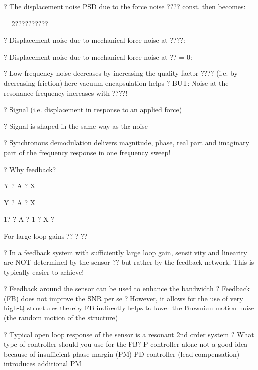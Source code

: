 \documentclass[2pt,landscape]{article}
\begin{document}
\begin{multicols*}{5}
?	The displacement noise PSD due to the force noise ????
const. then becomes:


= 2?????????? =








?	Displacement noise due to 
mechanical force noise at ????:

?	Displacement noise due to 
mechanical force noise at ?? = 0:


?	Low frequency noise decreases by 
increasing the quality factor ???? (i.e. by 
decreasing friction)	here 
vacuum encapsulation helps
?	BUT: Noise at the resonance 
frequency increases with ????!



?	Signal (i.e. displacement in response to an applied force)


?	Signal is shaped in the same way as the noise








?	Synchronous demodulation delivers magnitude, phase, real part and 
imaginary part of the frequency response in one frequency sweep!





?	Why feedback?



Y ? A ? X









Y ?	A	? X

1? ? A
? 1 ? X
?

For large loop gains ?? ? ??

?	In a feedback system with sufficiently large loop gain, sensitivity and 
linearity are NOT determined by the sensor ?? but rather by the 
feedback network. This is typically easier to achieve!





?	Feedback around the sensor can be used to enhance the bandwidth
?	Feedback (FB) does not improve the SNR per se
?	However, it allows for the use of very high-Q structures
thereby FB indirectly helps to lower the Brownian motion noise 
(the random motion of the structure)





?	Typical open loop response of the sensor is a resonant 2nd order system
?	What type of controller should you use for the FB?
\textbullet 	P-controller alone not a good idea because of insufficient phase margin (PM)
\textbullet 	PD-controller (lead compensation) introduces additional PM




\end{multicols*}
\end{document}
